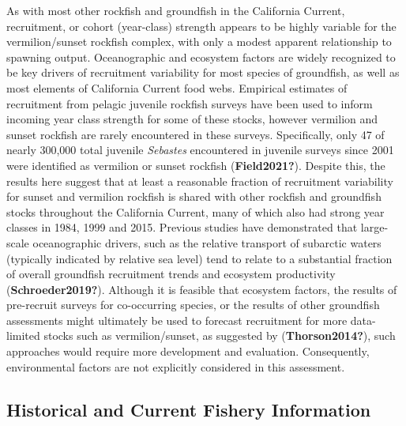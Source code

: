 \documentclass[11pt,
  english,
  a4paper,
]{article}
\begin{document}

As with most other rockfish and groundfish in the California Current, recruitment, or cohort (year-class) strength appears to be highly variable for the vermilion/sunset rockfish complex, with only a modest apparent relationship to spawning output. Oceanographic and ecosystem factors are widely recognized to be key drivers of recruitment variability for most species of groundfish, as well as most elements of California Current food webs. Empirical estimates of recruitment from pelagic juvenile rockfish surveys have been used to inform incoming year class strength for some of these stocks, however vermilion and sunset rockfish are rarely encountered in these surveys. Specifically, only 47 of nearly 300,000 total juvenile \emph{Sebastes} encountered in juvenile surveys since 2001 were identified as vermilion or sunset rockfish {(\textbf{Field2021?})\leavevmode\tagmcend\tagstructend}. Despite this, the results here suggest that at least a reasonable fraction of recruitment variability for sunset and vermilion rockfish is shared with other rockfish and groundfish stocks throughout the California Current, many of which also had strong year classes in 1984, 1999 and 2015. Previous studies have demonstrated that large-scale oceanographic drivers, such as the relative transport of subarctic waters (typically indicated by relative sea level) tend to relate to a substantial fraction of overall groundfish recruitment trends and ecosystem productivity {(\textbf{Schroeder2019?})\leavevmode\tagmcend\tagstructend}. Although it is feasible that ecosystem factors, the results of pre-recruit surveys for co-occurring species, or the results of other groundfish assessments might ultimately be used to forecast recruitment for more data-limited stocks such as vermilion/sunset, as suggested by {(\textbf{Thorson2014?})\leavevmode\tagmcend\tagstructend}, such approaches would require more development and evaluation. Consequently, environmental factors are not explicitly considered in this assessment.

\leavevmode\tagmcend\tagstructend\par


\hypertarget{historical-and-current-fishery-information}{%
\subsection{Historical and Current Fishery Information}\label{historical-and-current-fishery-information}}
\end{document}

